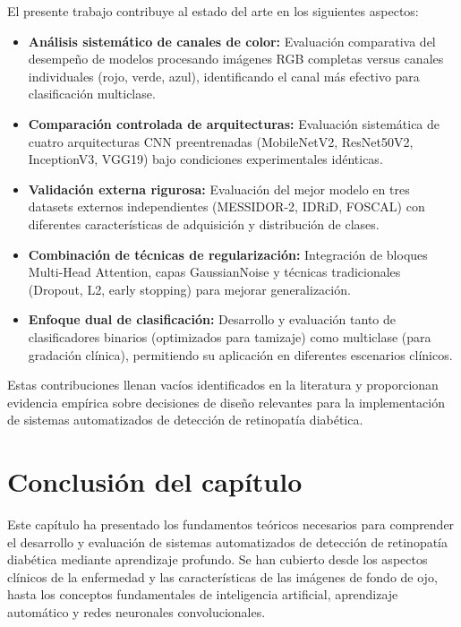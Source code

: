 El presente trabajo contribuye al estado del arte en los siguientes aspectos:

\begin{itemize}
    \item \textbf{Análisis sistemático de canales de color:} Evaluación comparativa del desempeño de modelos procesando imágenes RGB completas versus canales individuales (rojo, verde, azul), identificando el canal más efectivo para clasificación multiclase.

    \item \textbf{Comparación controlada de arquitecturas:} Evaluación sistemática de cuatro arquitecturas CNN preentrenadas (MobileNetV2, ResNet50V2, InceptionV3, VGG19) bajo condiciones experimentales idénticas.

    \item \textbf{Validación externa rigurosa:} Evaluación del mejor modelo en tres datasets externos independientes (MESSIDOR-2, IDRiD, FOSCAL) con diferentes características de adquisición y distribución de clases.

    \item \textbf{Combinación de técnicas de regularización:} Integración de bloques Multi-Head Attention, capas GaussianNoise y técnicas tradicionales (Dropout, L2, early stopping) para mejorar generalización.

    \item \textbf{Enfoque dual de clasificación:} Desarrollo y evaluación tanto de clasificadores binarios (optimizados para tamizaje) como multiclase (para gradación clínica), permitiendo su aplicación en diferentes escenarios clínicos.
\end{itemize}

Estas contribuciones llenan vacíos identificados en la literatura y proporcionan evidencia empírica sobre decisiones de diseño relevantes para la implementación de sistemas automatizados de detección de retinopatía diabética.

\section*{Conclusión del capítulo}

Este capítulo ha presentado los fundamentos teóricos necesarios para comprender el desarrollo y evaluación de sistemas automatizados de detección de retinopatía diabética mediante aprendizaje profundo. Se han cubierto desde los aspectos clínicos de la enfermedad y las características de las imágenes de fondo de ojo, hasta los conceptos fundamentales de inteligencia artificial, aprendizaje automático y redes neuronales convolucionales.

